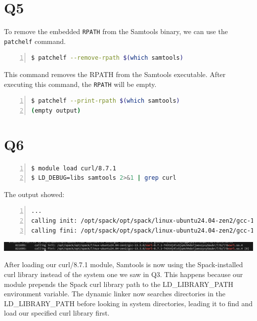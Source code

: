 \documentclass{article}
\begin{document}
\section*{Q5}

To remove the embedded \texttt{RPATH} from the Samtools binary, we can use the \texttt{patchelf} command.

\begin{lstlisting}[language=bash, basicstyle=\ttfamily\small, numbers=left, numberstyle=\tiny\color{gray}, stepnumber=1, frame=single, breaklines=true, breakatwhitespace=false]
$ patchelf --remove-rpath $(which samtools)
\end{lstlisting}

This command removes the RPATH from the Samtools executable. After executing this command, the \texttt{RPATH} will be empty.

\begin{lstlisting}[language=bash, basicstyle=\ttfamily\small, numbers=left, numberstyle=\tiny\color{gray}, stepnumber=1, frame=single, breaklines=true, breakatwhitespace=false]
$ patchelf --print-rpath $(which samtools)
(empty output)
\end{lstlisting}

\section*{Q6}

\begin{lstlisting}[language=bash, basicstyle=\ttfamily\small, numbers=left, numberstyle=\tiny\color{gray}, stepnumber=1, frame=single, breaklines=true, breakatwhitespace=false]
$ module load curl/8.7.1
$ LD_DEBUG=libs samtools 2>&1 | grep curl
\end{lstlisting}

The output showed:

\begin{lstlisting}[language=bash, basicstyle=\ttfamily\small, numbers=left, numberstyle=\tiny\color{gray}, stepnumber=1, frame=single, breaklines=true, breakatwhitespace=false]
...
calling init: /opt/spack/opt/spack/linux-ubuntu24.04-zen2/gcc-13.3.0/curl-8.7.1-743t4j4lv5jq4chhdoijaexzyvy5aubr/lib/libcurl.so.4
calling fini: /opt/spack/opt/spack/linux-ubuntu24.04-zen2/gcc-13.3.0/curl-8.7.1-743t4j4lv5jq4chhdoijaexzyvy5aubr/lib/libcurl.so.4 [0]
\end{lstlisting}

\begin{center}
    \includegraphics[width=1\textwidth]{./img/q6.png}
\end{center}

After loading our curl/8.7.1 module, Samtools is now using the Spack-installed curl library instead of the system one we saw in Q3. This happens because our module prepends the Spack curl library path to the LD\_LIBRARY\_PATH environment variable. The dynamic linker now searches directories in the LD\_LIBRARY\_PATH before looking in system directories, leading it to find and load our specified curl library first.
\end{document}
